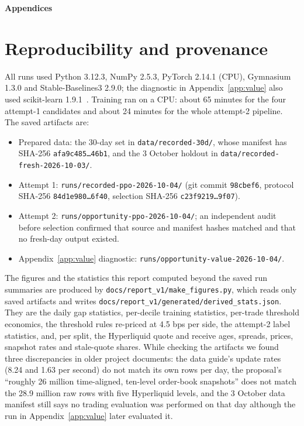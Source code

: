 \documentclass[12pt,a4paper]{article}
\DeclareRobustCommand{\bps}{\ifmmode\,\text{bps}\else\,bps\fi}
\begin{document}
\clearpage
\appendix
\renewcommand{\thesection}{\Alph{section}}
\begin{center}{\Large\bfseries Appendices}\end{center}

\section{Reproducibility and provenance}\label{app:repro}
All runs used Python 3.12.3, NumPy 2.5.3, PyTorch 2.14.1 (CPU), Gymnasium 1.3.0 and
Stable-Baselines3 2.9.0; the diagnostic in Appendix~\ref{app:value} also used scikit-learn
1.9.1~\cite{sklearn}. Training ran on a CPU: about 65 minutes for the four attempt-1
candidates and about 24 minutes for the whole attempt-2 pipeline. The saved artifacts are:
\begin{itemize}
\item Prepared data: the 30-day set in \texttt{data/recorded-30d/}, whose manifest has
SHA-256 \texttt{afa9c485\ldots46b1}, and the 3 October holdout in
\texttt{data/recorded-fresh-2026-10-03/}.
\item Attempt 1: \texttt{runs/recorded-ppo-2026-10-04/} (git commit \texttt{98cbef6},
protocol SHA-256 \texttt{84d1e980\ldots6f40}, selection SHA-256
\texttt{c23f9219\ldots9f07}).
\item Attempt 2: \texttt{runs/opportunity-ppo-2026-10-04/}; an independent audit before
selection confirmed that source and manifest hashes matched and that no fresh-day output
existed.
\item Appendix~\ref{app:value} diagnostic: \texttt{runs/opportunity-value-2026-10-04/}.
\end{itemize}
The figures and the statistics this report computed beyond the saved run summaries are
produced by \texttt{docs/report\_v1/make\_figures.py}, which reads only saved artifacts and
writes \texttt{docs/report\_v1/generated/derived\_stats.json}. They are the daily gap
statistics, per-decile training statistics, per-trade threshold economics, the threshold
rules re-priced at 4.5\bps{} per side, the attempt-2 label statistics, and, per split, the
Hyperliquid quote and receive ages, spreads, prices, snapshot rates and stale-quote shares.
While checking the artifacts we found three discrepancies in older project documents: the
data guide's update rates (8.24 and 1.63 per second) do not match its own rows per day, the
proposal's ``roughly 26 million time-aligned, ten-level order-book snapshots'' does not
match the 28.9 million raw rows with five Hyperliquid levels, and the 3 October data
manifest still says no trading evaluation was performed on that day although the run in
Appendix~\ref{app:value} later evaluated it.
\end{document}
